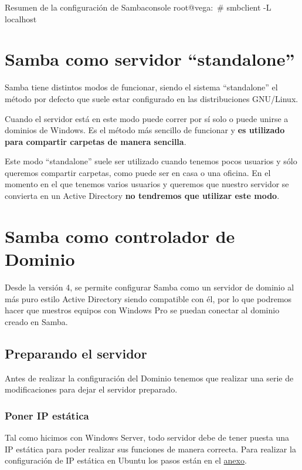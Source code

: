 \begin{mycode}{Resumen de la configuración de Samba}{console}{}
root@vega:~# smbclient -L localhost
\end{mycode}


\section{Samba como servidor “standalone”}
Samba tiene distintos modos de funcionar, siendo el sistema “standalone” el método por defecto que suele estar configurado en las distribuciones GNU/Linux.

Cuando el servidor está en este modo puede correr por sí solo o puede unirse a dominios de Windows. Es el método más sencillo de funcionar y \textbf{es utilizado para compartir carpetas de manera sencilla}.

Este modo “standalone” suele ser utilizado cuando tenemos pocos usuarios y sólo queremos compartir carpetas, como puede ser en casa o una oficina. En el momento en el que tenemos varios usuarios y queremos que nuestro servidor se convierta en un Active Directory \textbf{no tendremos que utilizar este modo}.


\section{Samba como controlador de Dominio}
Desde la versión 4, se permite configurar Samba como un servidor de dominio al más puro estilo Active Directory siendo compatible con él, por lo que podremos hacer que nuestros equipos con Windows Pro se puedan conectar al dominio creado en Samba.

\subsection{Preparando el servidor}
Antes de realizar la configuración del Dominio tenemos que realizar una serie de modificaciones para dejar el servidor preparado.

\subsubsection{Poner IP estática}
Tal como hicimos con Windows Server, todo servidor debe de tener puesta una IP estática para poder realizar sus funciones de manera correcta. Para realizar la configuración de IP estática en Ubuntu los pasos están en el \hyperlink{configurar_ip_estatica_ubuntu}{anexo}.


